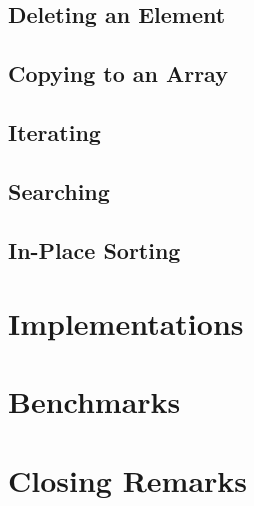 \documentclass{article}
\begin{document}
	\subsection{Deleting an Element}
	
	\subsection{Copying to an Array}
	
	\subsection{Iterating}
	
	\subsection{Searching}
	
	\subsection{In-Place Sorting}
	
	\section{Implementations}
	\label{Implementations}
	
	\section{Benchmarks}
	\label{Benchmarks}
	
	\section{Closing Remarks}
	\label{Closing Remarks}
	
\end{document}
